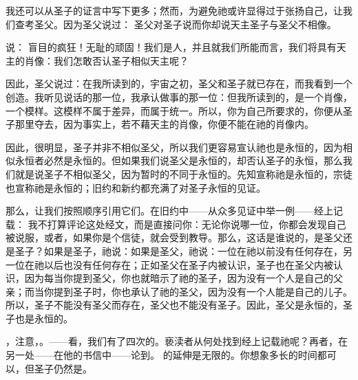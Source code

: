 我还可以从圣子的证言中写下更多；然而，为避免祂或许显得过于张扬自己，让我们查考圣父。因为圣父说过： 圣父对圣子说而你却说天主圣子与圣父不相像。\par

说：  盲目的疯狂！无耻的顽固！我们是人，并且就我们所能而言，我们将具有天主的肖像：我们怎敢否认圣子相似天主呢？\par

因此，圣父说过：在我所读到的，宇宙之初，圣父和圣子就已存在，而我看到一个创造。我听见说话的那一位，我承认做事的那一位：但我所读到的，是一个肖像，一个模样。这模样不属于差异，而属于统一。所以，你为自己所要求的，你便从圣子那里夺去，因为事实上，若不藉天主的肖像，你便不能在祂的肖像内。\par

\par

因此，很明显，圣子并非不相似圣父，所以我们更容易宣认祂也是永恒的，因为相似永恒者必然是永恒的。但如果我们说圣父是永恒的，却否认圣子的永恒，那么我们就是说圣子不相似圣父，因为暂时的不同于永恒的。先知宣称祂是永恒的，宗徒也宣称祂是永恒的；旧约和新约都充满了对圣子永恒的见证。\par

那么，让我们按照顺序引用它们。在旧约中——从众多见证中举一例——经上记载： 我不打算评论这处经文，而是直接问你：无论你说哪一位，你都会发现自己被说服，或者，如果你是个信徒，就会受到教导。那么，这话是谁说的，是圣父还是圣子？如果是圣子，祂说：如果是圣父，祂说：一位在祂以前没有任何存在，另一位在祂以后也没有任何存在；正如圣父在圣子内被认识，圣子也在圣父内被认识，因为每当你提到圣父，你也就暗示了祂的圣子，因为没有一个人是自己的父亲；而当你提到圣子时，你也承认了祂的圣父，因为没有一个人能是自己的儿子。所以，圣子不能没有圣父而存在，圣父也不能没有圣子。因此，圣父是永恒的，圣子也是永恒的。\par

，注意，。——看，我们有了四次的。亵渎者从何处找到经上记载祂呢？再者，在另一处——在他的书信中——论到。 的延伸是无限的。你想象多长的时间都可以，但圣子仍然是。\par

